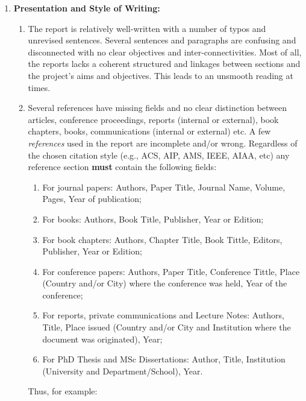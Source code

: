 \documentclass[14pt,twoside]{report}
\begin{document}
\begin{enumerate}
%
    \item {\bf Presentation and Style of Writing:}
                \begin{enumerate}
                   \item The report is relatively well-written with a number of typos and unrevised sentences. Several sentences and paragraphs are confusing and disconnected with no clear objectives and inter-connectivities. Most of all, the reports lacks a coherent structured and linkages between sections and the project's aims and objectives. This leads to an unsmooth reading at times.
                   \item Several references have missing fields and no clear distinction between articles, conference proceedings, reports (internal or external), book chapters, books, communications (internal or external) etc.  A few {\it references} used in the report are incomplete and/or wrong. Regardless of the chosen citation style (e.g., ACS, AIP, AMS, IEEE, AIAA, etc) any reference section {\bf must} contain the following fields: 
                      \begin{enumerate}
                         \item For journal papers: Authors, Paper Title, Journal Name, Volume, Pages, Year of publication;
                         \item For books: Authors, Book Title, Publisher, Year or Edition;
                         \item For book chapters: Authors, Chapter Title, Book Tittle, Editors, Publisher, Year or Edition;
                         \item For conference papers: Authors, Paper Title, Conference Tittle, Place (Country and/or City) where the conference was held, Year of the conference;
                         \item For reports, private communications and Lecture Notes: Authors, Title, Place issued (Country and/or City and Institution where the document was originated), Year;
                         \item For PhD Thesis and MSc Dissertations: Author, Title, Institution (University and Department/School), Year.
                      \end{enumerate}  
                      Thus, for example:
\end{enumerate}
\end{enumerate}
\end{document}
